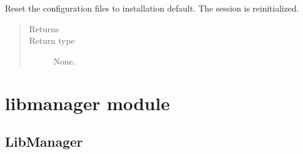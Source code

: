 \documentclass[letterpaper,10pt,english]{sphinxmanual}
\begin{document}
\begin{fulllineitems}
\begin{fulllineitems}
\label{\detokenize{api/initobjects:main.Session.restore_default_settings}}
\sphinxAtStartPar
Reset the configuration files to installation default. The session
is re\sphinxhyphen{}initialized.
\begin{quote}\begin{description}
\item[{Returns}] \leavevmode
\sphinxAtStartPar


\item[{Return type}] \leavevmode
\sphinxAtStartPar
None.

\end{description}\end{quote}

\end{fulllineitems}


\end{fulllineitems}



\section{libmanager module}
\label{\detokenize{api/initobjects:libmanager-module}}

\subsection{LibManager}
\label{\detokenize{api/initobjects:libmanager}}\label{\detokenize{api/initobjects:libmanagerob}}
\end{document}
